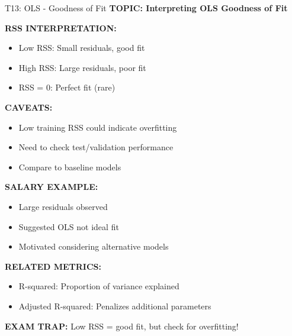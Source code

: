 \documentclass[8pt]{beamer}
\begin{document}
	\begin{frame}{T13: OLS - Goodness of Fit}
		\fontsize{6.5}{7.5}\selectfont
		\textbf{TOPIC: Interpreting OLS Goodness of Fit}
		
		\vspace{0.1cm}
		\textbf{RSS INTERPRETATION:}
		\begin{itemize}
			\item \textcolor{myblue}{Low RSS:} Small residuals, good fit
			\item \textcolor{myblue}{High RSS:} Large residuals, poor fit
			\item \textcolor{myblue}{RSS = 0:} Perfect fit (rare)
		\end{itemize}
		
		\vspace{0.1cm}
		\textbf{CAVEATS:}
		\begin{itemize}
			\item Low training RSS could indicate overfitting
			\item Need to check test/validation performance
			\item Compare to baseline models
		\end{itemize}
		
		\vspace{0.1cm}
		\textbf{SALARY EXAMPLE:}
		\begin{itemize}
			\item Large residuals observed
			\item Suggested OLS not ideal fit
			\item Motivated considering alternative models
		\end{itemize}
		
		\vspace{0.1cm}
		\textbf{RELATED METRICS:}
		\begin{itemize}
			\item R-squared: Proportion of variance explained
			\item Adjusted R-squared: Penalizes additional parameters
		\end{itemize}
		
		\textcolor{myred}{\textbf{EXAM TRAP:}} Low RSS = \textcolor{myblue}{good fit}, but check for overfitting!
	\end{frame}
	
\end{document}
